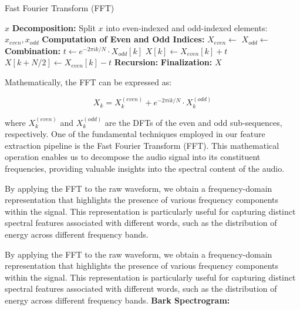 \documentclass[a4paper]{report}
\begin{document}
{\begin{algorithm}
\caption{Fast Fourier Transform (FFT)}
\begin{algorithmic}[1]
            \State \Return $x$ 
        \EndIf
        \State \textbf{Decomposition:}
        \State Split $x$ into even-indexed and odd-indexed elements: $x_{even}, x_{odd}$
        \State \textbf{Computation of Even and Odd Indices:}
        \State $X_{even} \gets$  
        \State $X_{odd} \gets$  
        \State \textbf{Combination:}
         
            \State $t \gets e^{-2\pi i k / N} \cdot X_{odd}[k]$ 
            \State $X[k] \gets X_{even}[k] + t$
            \State $X[k + N/2] \gets X_{even}[k] - t$
        \EndFor
        \State \textbf{Recursion:}
        \State {} 
        \State \textbf{Finalization:}
        \State \Return $X$
    \EndProcedure
\end{algorithmic}
\end{algorithm}

Mathematically, the FFT can be expressed as:

\[
X_k = X^{(even)}_k + e^{-2\pi i k / N} \cdot X^{(odd)}_k
\]

where \( X^{(even)}_k \) and \( X^{(odd)}_k \) are the DFTs of the even and odd sub-sequences, respectively.
One of the fundamental techniques employed in our feature extraction pipeline is the Fast Fourier Transform (FFT). This mathematical operation enables us to decompose the audio signal into its constituent frequencies, providing valuable insights into the spectral content of the audio.

By applying the FFT to the raw waveform, we obtain a frequency-domain representation that highlights the presence of various frequency components within the signal. This representation is particularly useful for capturing distinct spectral features associated with different words, such as the distribution of energy across different frequency bands.
\begin{center}
    
\end{center}
By applying the FFT to the raw waveform, we obtain a frequency-domain representation that highlights the presence of various frequency components within the signal. This representation is particularly useful for capturing distinct spectral features associated with different words, such as the distribution of energy across different frequency bands.\vspace{1cm}
\textbf{Bark Spectrogram:}

}
\end{document}

